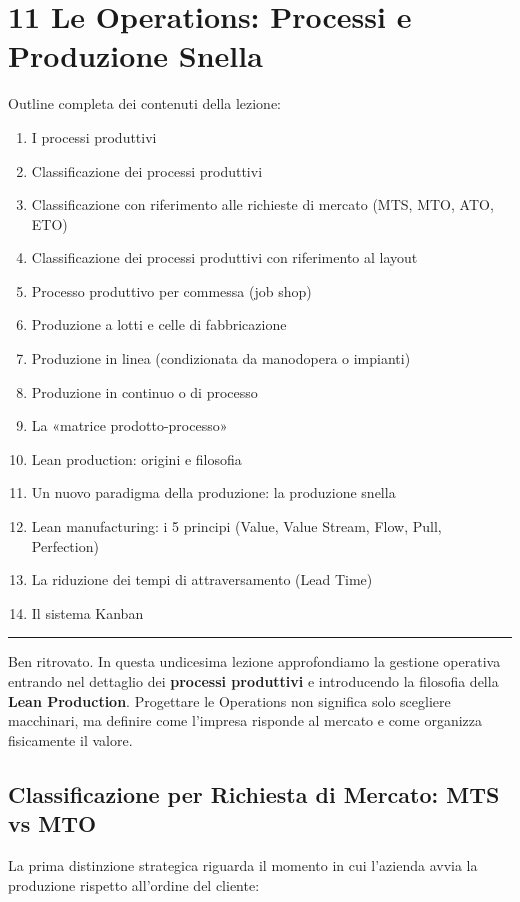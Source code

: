 \documentclass[a4paper,10pt]{article}
\begin{document}
\section*{11 Le Operations: Processi e Produzione Snella}

Outline completa dei contenuti della lezione:
{\small
\begin{enumerate}
\item I processi produttivi
\item Classificazione dei processi produttivi
\item Classificazione con riferimento alle richieste di mercato (MTS, MTO, ATO, ETO)
\item Classificazione dei processi produttivi con riferimento al layout
\item Processo produttivo per commessa (job shop)
\item Produzione a lotti e celle di fabbricazione
\item Produzione in linea (condizionata da manodopera o impianti)
\item Produzione in continuo o di processo
\item La «matrice prodotto-processo»
\item Lean production: origini e filosofia
\item Un nuovo paradigma della produzione: la produzione snella
\item Lean manufacturing: i 5 principi (Value, Value Stream, Flow, Pull, Perfection)
\item La riduzione dei tempi di attraversamento (Lead Time)
\item Il sistema Kanban
\end{enumerate}
}
\hrule
\vspace{0.5cm}

Ben ritrovato. In questa undicesima lezione approfondiamo la gestione operativa entrando nel dettaglio dei \textbf{processi produttivi} e introducendo la filosofia della \textbf{Lean Production}. Progettare le Operations non significa solo scegliere macchinari, ma definire come l'impresa risponde al mercato e come organizza fisicamente il valore.

\subsection*{Classificazione per Richiesta di Mercato: MTS vs MTO}

La prima distinzione strategica riguarda il momento in cui l'azienda avvia la produzione rispetto all'ordine del cliente:
\end{document}
